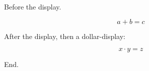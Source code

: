 Before the display.

\[ a + b = c \]

After the display, then a dollar-display:

$$ x \cdot y = z $$

End.

